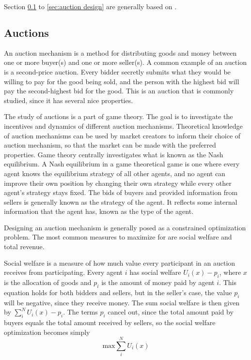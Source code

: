 Section \ref{sec:auctions} to \ref{sec:auction design} are generally based on \cite{algo_game_theory}.

\subsection{Auctions} \label{sec:auctions}
An auction mechanism is a method for distributing goods and money between one
or more buyer(s) and one or more seller(s). A common example of an auction is a
second-price auction. Every bidder secretly submits what they would be willing
to pay for the good being sold, and the person with the highest bid will pay
the second-highest bid for the good. This is an auction that is commonly
studied, since it has several nice properties.

The study of auctions is a part of game theory. The goal is to investigate the
incentives and dynamics of different auction mechanisms. Theoretical knowledge
of auction mechanisms can be used by market creators to inform their choice of
auction mechanism, so that the market can be made with the preferred
properties. Game theory centrally investigates what is known as the Nash
equilibrium. A Nash equilibrium in a game theoretical game is one where every
agent knows the equilibrium strategy of all other agents, and no agent can
improve their own position by changing their own strategy while every other
agent's strategy stays fixed. The bids of buyers and provided information from
sellers is generally known as the strategy of the agent. It reflects some
internal information that the agent has, known as the type of the agent.

Designing an auction mechanism is generally posed as a constrained optimization
problem. The most common measures to maximize for are social welfare and total
revenue.

Social welfare is a measure of how much value every participant in an auction
receives from participating. Every agent $i$ has social welfare $U_i(x) - p_i$,
where $x$ is the allocation of goods and $p_i$ is the amount of money paid by
agent $i$. This equation holds for both bidders and sellers, but in the
seller's case, the value $p_i$ will be negative, since they receive money. The
sum social welfare is then given by $\sum_i^N U_i(x)-p_i$. The terms $p_i$
cancel out, since the total amount paid by buyers equals the total amount
received by sellers, so the social welfare optimization becomes simply
\begin{equation}
    \text{max} \sum_i^N U_i(x)
\end{equation}

